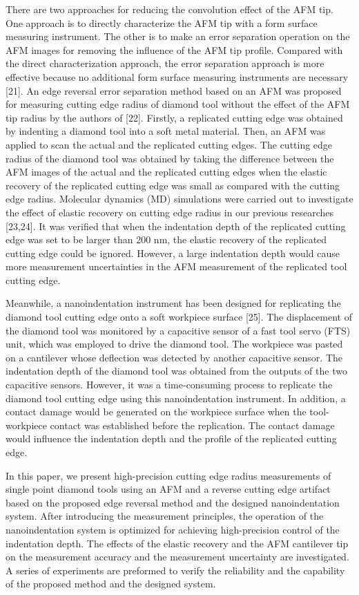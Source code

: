\documentclass{article}
\begin{document}
There are two approaches for reducing the convolution effect of the AFM tip. One approach is to directly characterize the AFM tip with a form surface measuring instrument. The other is to make an error separation operation on the AFM images for removing the influence of the AFM tip profile. Compared with the direct characterization approach, the error separation approach is more effective because no additional form surface measuring instruments are necessary [21]. An edge reversal error separation method based on an AFM was proposed for measuring cutting edge radius of diamond tool without the effect of the AFM tip radius by the authors of [22]. Firstly, a replicated cutting edge was obtained by indenting a diamond tool into a soft metal material. Then, an AFM was applied to scan the actual and the replicated cutting edges. The cutting edge radius of the diamond tool was obtained by taking the difference between the AFM images of the actual and the replicated cutting edges when the elastic recovery of the replicated cutting edge was small as compared with the cutting edge radius. Molecular dynamics (MD) simulations were carried out to investigate the effect of elastic recovery on cutting edge radius in our previous researches [23,24]. It was verified that when the indentation depth of the replicated cutting edge was set to be larger than 200 nm, the elastic recovery of the replicated cutting edge could be ignored. However, a large indentation depth would cause more measurement uncertainties in the AFM measurement of the replicated tool cutting edge.

Meanwhile, a nanoindentation instrument has been designed for replicating the diamond tool cutting edge onto a soft workpiece surface [25]. The displacement of the diamond tool was monitored by a capacitive sensor of a fast tool servo (FTS) unit, which was employed to drive the diamond tool. The workpiece was pasted on a cantilever whose deflection was detected by another capacitive sensor. The indentation depth of the diamond tool was obtained from the outputs of the two capacitive sensors. However, it was a time-consuming process to replicate the diamond tool cutting edge using this nanoindentation instrument. In addition, a contact damage would be generated on the workpiece surface when the tool-workpiece contact was established before the replication. The contact damage would influence the indentation depth and the profile of the replicated cutting edge.

In this paper, we present high-precision cutting edge radius measurements of single point diamond tools using an AFM and a reverse cutting edge artifact based on the proposed edge reversal method and the designed nanoindentation system. After introducing the measurement principles, the operation of the nanoindentation system is optimized for achieving high-precision control of the indentation depth. The effects of the elastic recovery and the AFM cantilever tip on the measurement accuracy and the measurement uncertainty are investigated. A series of experiments are preformed to verify the reliability and the capability of the proposed method and the designed system.
\end{document}
